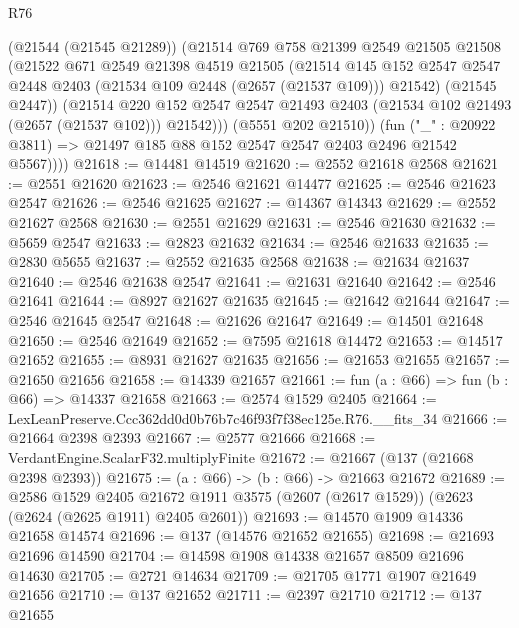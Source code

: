 \begin{lexlean}{R76}
\begin{coremodule}
              (@21544 (@21545 @21289))
              (@21514
                @769
                @758
                @21399
                @2549
                @21505
                @21508
                (@21522
                  @671
                  @2549
                  @21398
                  @4519
                  @21505
                  (@21514
                    @145
                    @152
                    @2547
                    @2547
                    @2448
                    @2403
                    (@21534 @109 @2448 (@2657 (@21537 @109)))
                    @21542)
                  (@21545 @2447))
                (@21514
                  @220
                  @152
                  @2547
                  @2547
                  @21493
                  @2403
                  (@21534 @102 @21493 (@2657 (@21537 @102)))
                  @21542)))
            (@5551 @202 @21510))
          (fun ("_" : @20922 @3811) => @21497 @185 @88 @152 @2547 @2547 @2403 @2496 @21542 @5567))))
@21618 := @14481 @14519
@21620 := @2552 @21618 @2568
@21621 := @2551 @21620
@21623 := @2546 @21621 @14477
@21625 := @2546 @21623 @2547
@21626 := @2546 @21625
@21627 := @14367 @14343
@21629 := @2552 @21627 @2568
@21630 := @2551 @21629
@21631 := @2546 @21630
@21632 := @5659 @2547
@21633 := @2823 @21632
@21634 := @2546 @21633
@21635 := @2830 @5655
@21637 := @2552 @21635 @2568
@21638 := @21634 @21637
@21640 := @2546 @21638 @2547
@21641 := @21631 @21640
@21642 := @2546 @21641
@21644 := @8927 @21627 @21635
@21645 := @21642 @21644
@21647 := @2546 @21645 @2547
@21648 := @21626 @21647
@21649 := @14501 @21648
@21650 := @2546 @21649
@21652 := @7595 @21618 @14472
@21653 := @14517 @21652
@21655 := @8931 @21627 @21635
@21656 := @21653 @21655
@21657 := @21650 @21656
@21658 := @14339 @21657
@21661 := fun (a : @66) => fun (b : @66) => @14337 @21658
@21663 := @2574 @1529 @2405
@21664 := LexLeanPreserve.Ccc362dd0d0b76b7c46f93f7f38ec125e.R76.__fits_34
@21666 := @21664 @2398 @2393
@21667 := @2577 @21666
@21668 := VerdantEngine.ScalarF32.multiplyFinite
@21672 := @21667 (@137 (@21668 @2398 @2393))
@21675 := (a : @66) -> (b : @66) -> @21663 @21672
@21689 := @2586
    @1529
    @2405
    @21672
    @1911
    @3575
    (@2607 (@2617 @1529))
    (@2623 (@2624 (@2625 @1911) @2405 @2601))
@21693 := @14570 @1909 @14336 @21658 @14574
@21696 := @137 (@14576 @21652 @21655)
@21698 := @21693 @21696 @14590
@21704 := @14598 @1908 @14338 @21657 @8509 @21696 @14630
@21705 := @2721 @14634
@21709 := @21705 @1771 @1907 @21649 @21656
@21710 := @137 @21652
@21711 := @2397 @21710
@21712 := @137 @21655

\end{coremodule}
\end{lexlean}
